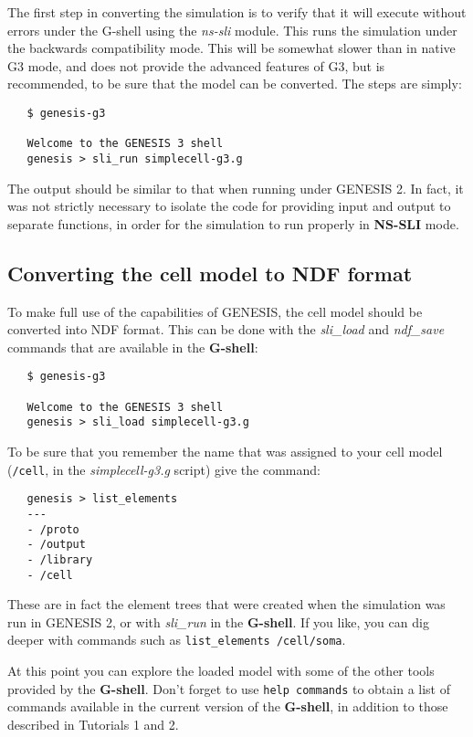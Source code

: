 \documentclass[12pt]{article}
\begin{document}
The first step in converting the simulation is to verify that
it will execute without errors under the G-shell using the {\it ns-sli}
module.  
This runs the simulation under the backwards compatibility
mode.  This will be somewhat slower than in native G3 mode, and does not
provide the advanced features of G3, but is recommended, to be sure that
the model can be converted.  The steps are simply:
\begin{verbatim}
   $ genesis-g3

   Welcome to the GENESIS 3 shell
   genesis > sli_run simplecell-g3.g
\end{verbatim}
The output should be similar to that when running under GENESIS 2.  In fact,
it was not strictly necessary to isolate the code for providing input
and output to separate functions, in order for the simulation to
run properly in {\bf NS-SLI} mode.

\subsection*{Converting the cell model to NDF format}

To make full use of the capabilities of GENESIS, the cell model should
be converted into NDF format.  This can be done with the {\it sli\_load}
and {\it ndf\_save} commands that are available in the {\bf G-shell}:
\begin{verbatim}
   $ genesis-g3

   Welcome to the GENESIS 3 shell
   genesis > sli_load simplecell-g3.g
\end{verbatim}
To be sure that you remember the name that was assigned to your cell model
({\tt /cell}, in the {\it simplecell-g3.g} script) give the command:
\begin{verbatim}
   genesis > list_elements
   ---
   - /proto
   - /output
   - /library
   - /cell
\end{verbatim}
These are in fact the element trees that were created when the simulation
was run in GENESIS 2, or with {\it sli\_run} in the {\bf G-shell}.  If you like, you can
dig deeper with commands such as {\tt list\_elements /cell/soma}.


At this point you can explore the loaded model with some of the other tools
provided by the {\bf G-shell}.  Don't forget to use {\tt help commands} to obtain
a list of commands available in the current version of the {\bf G-shell}, in
addition to those described in Tutorials 1 and 2.
\end{document}
